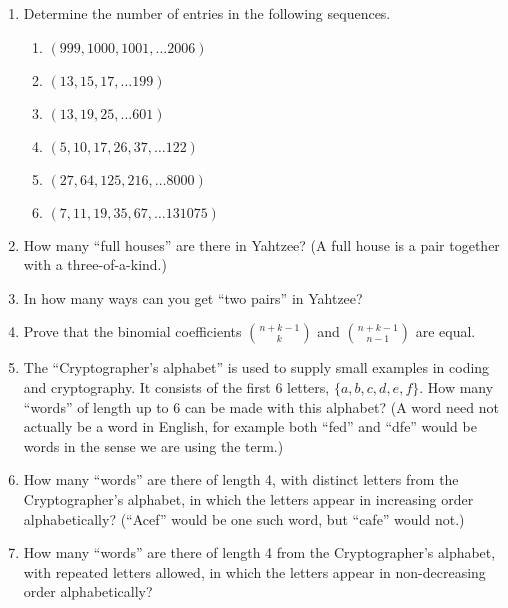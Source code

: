 \begin{enumerate}
\item Determine the number of entries in the following sequences.

  \begin{enumerate}
  \item \wbitemsep $(999, 1000, 1001, \ldots  2006)$
  \item \wbitemsep $(13, 15, 17, \ldots 199)$
  \item \wbitemsep $(13, 19, 25, \ldots 601)$
  \item \wbitemsep $(5, 10, 17, 26, 37, \ldots 122)$
  \item \wbitemsep $(27, 64, 125, 216, \ldots 8000)$
  \item \wbitemsep $(7, 11, 19, 35, 67, \ldots 131075)$
  \end{enumerate}

\workbookpagebreak

\item How many ``full houses'' are there in Yahtzee?  (A full house is a pair
together with a three-of-a-kind.)

\wbvfill

\item In how many ways can you get ``two pairs'' in Yahtzee?

\wbvfill

\item Prove that the binomial coefficients $\displaystyle \binom{n+k-1}{k}$
and $\displaystyle \binom{n+k-1}{n-1}$ are equal.

\wbvfill

\workbookpagebreak

\item The ``Cryptographer's alphabet'' is used to supply small examples
in coding and cryptography.  It consists of the first 6 letters, $\{a, b, c, d, e, f\}$.  How many ``words'' of length up to 6 can be made with this 
alphabet?  (A word need not actually be a word in English, for example 
both ``fed'' and ``dfe'' would be words in the sense we are using the term.)

\wbvfill

\item How many ``words'' are there of length 4, with distinct letters from the 
Cryptographer's alphabet, in which the letters appear in increasing order 
alphabetically?  (``Acef'' would be one such word, but ``cafe'' would not.)

\wbvfill

\item How many ``words'' are there of length 4 from the 
Cryptographer's alphabet, with repeated letters allowed,
 in which the letters appear in non-decreasing order alphabetically?


\end{enumerate}
